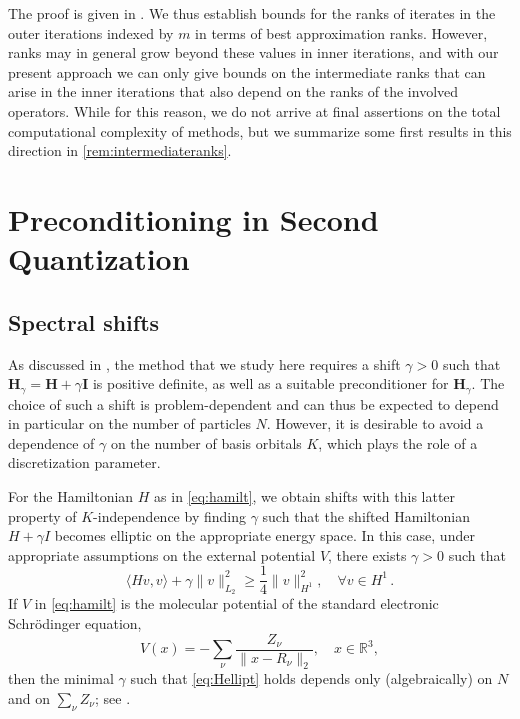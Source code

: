 \documentclass[a4paper,11pt,oneside]{amsart}
\providecommand{\norm}[1]{\lVert#1\rVert}
\theoremstyle{definition}
\theoremstyle{remark}
\newcommand{\R}{\mathbb{R}}
\newcommand{\ten}[1]{\boldsymbol{#1}}
\numberwithin{equation}{section}
\numberwithin{theorem}{section}
\begin{document}
The proof is given in .
We thus establish bounds for the ranks of iterates in the outer iterations indexed by $m$ in terms of best approximation ranks.
However, ranks may in general grow beyond these values in inner iterations, and with our present approach we can only give bounds on the intermediate ranks that can arise in the inner iterations that also depend on the ranks of the involved operators. 
While for this reason, we do not arrive at final assertions on the total computational complexity of methods, but we summarize some first results in this direction in \cref{rem:intermediateranks}.



\section{Preconditioning in Second Quantization}\label{sec:precinsc}

\subsection{Spectral shifts} \label{sec:shifts}
%
As discussed in , the method that we study here requires a shift $\gamma > 0$ such that $\ten H_\gamma = \ten H + \gamma \ten I$ is positive definite, as well as a suitable preconditioner for $\ten H_\gamma$. The choice of such a shift is problem-dependent and can thus be expected to depend in particular on the number of particles $N$. However, it is desirable to avoid a dependence of $\gamma$ on the number of basis orbitals $K$, which plays the role of a discretization parameter.

For the Hamiltonian $H$ as in \eqref{eq:hamilt}, we obtain shifts with this latter property of $K$-independence by finding $\gamma$ such that the shifted Hamiltonian $H + \gamma I$ becomes elliptic on the appropriate energy space. In this case, under appropriate assumptions on the external potential $V$, there  exists $\gamma>0$ such that
\begin{equation}\label{eq:Hellipt}
  \langle H v, v \rangle + \gamma \norm{v}_{L_2}^2 \geq \textstyle\frac14\displaystyle \norm{v}_{H^1}^2, \quad \forall v \in H^1\,.
\end{equation}
If $V$ in \eqref{eq:hamilt} is the molecular potential of the standard electronic Schr\"odinger equation,
\[
   V(x) =  - \sum_{\nu} \frac{Z_\nu}{\norm{x - R_\nu}_2} , \quad x \in \R^3,
\]
then the minimal $\gamma$ such that \eqref{eq:Hellipt} holds depends only (algebraically) on $N$ and on $\sum_{\nu} Z_\nu$; see \cite[eq.~(3.16)]{Y:10}.
\end{document}

